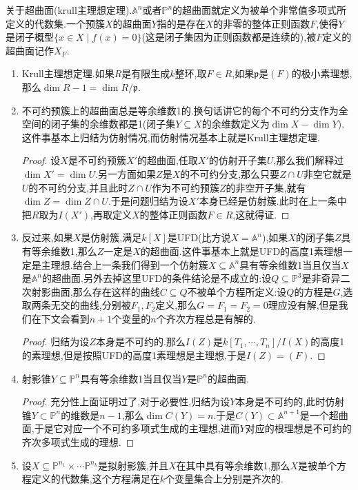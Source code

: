关于超曲面(krull主理想定理).$\mathbb{A}^n$或者$\mathbb{P}^n$的超曲面就定义为被单个非常值多项式所定义的代数集.一个预簇$X$的超曲面$Y$指的是存在$X$的非零的整体正则函数$F$,使得$Y$是闭子概型$\{x\in X\mid f(x)=0\}$(这是闭子集因为正则函数都是连续的),被$F$定义的超曲面记作$X_F$.
\begin{enumerate}
	\item Krull主理想定理.如果$R$是有限生成$k$整环,取$F\in R$,如果$\mathfrak{p}$是$(F)$的极小素理想,那么$\dim R-1=\dim R/\mathfrak{p}$.
	\item 不可约预簇上的超曲面总是等余维数1的.换句话讲它的每个不可约分支作为全空间的闭子集的余维数都是1(闭子集$Y\subseteq X$的余维数定义为$\dim X-\dim Y$).这件事基本上归结为仿射情况,而仿射情况基本上就是Krull主理想定理.
	\begin{proof}
		
		设$X$是不可约预簇$X'$的超曲面,任取$X'$的仿射开子集$U$,那么我们解释过$\dim X'=\dim U$.另一方面如果$Z$是$X$的不可约分支,那么只要$Z\cap U$非空它就是$U$的不可约分支,并且此时$Z\cap U$作为不可约预簇$Z$的非空开子集,就有$\dim Z=\dim Z\cap U$.于是问题归结为设$X'$本身已经是仿射簇.此时在上一条中把$R$取为$I(X')$,再取定义$X$的整体正则函数$F\in R$,这就得证.
	\end{proof}
	\item 反过来,如果$X$是仿射簇,满足$k[X]$是UFD(比方说$X=\mathbb{A}^n$),如果$X$的闭子集$Z$具有等余维数1,那么$Z$一定是$X$的超曲面.这件事基本上就是UFD的高度1素理想一定是主理想.结合上一条我们得到一个仿射簇$X\subseteq\mathbb{A}^n$具有等余维数1当且仅当$X$是$\mathbb{A}^n$的超曲面.另外去掉这里UFD的条件结论是不成立的:设$Q\subseteq\mathbb{P}^3$是非奇异二次射影曲面,那么存在这样的曲线$C\subseteq Q$不被单个方程所定义:设$Q$的方程是$G$,选取两条无交的曲线,分别被$F_1,F_2$定义,那么$G=F_1=F_2=0$理应没有解,但是我们在下文会看到$n+1$个变量的$n$个齐次方程总是有解的.
	\begin{proof}
		
		归结为设$Z$本身是不可约的.那么$I(Z)$是$k[T_1,\cdots,T_n]/I(X)$的高度1的素理想,但是按照UFD的高度1素理想是主理想,于是$I(Z)=(F)$.
	\end{proof}
	\item 射影锥$Y\subseteq\mathbb{P}^n$具有等余维数1当且仅当$Y$是$\mathbb{P}^n$的超曲面.
	\begin{proof}
		
		充分性上面证明过了,对于必要性,归结为设$Y$本身是不可约的,此时仿射锥$Y\subset\mathbb{P}^n$的维数是$n-1$,那么$\dim C(Y)=n$.于是$C(Y)\subset\mathbb{A}^{n+1}$是一个超曲面,于是它对应一个不可约多项式生成的主理想,进而$Y$对应的根理想是不可约的齐次多项式生成的理想.
	\end{proof}
	\item 设$X\subseteq\mathbb{P}^{n_1}\times\cdots\mathbb{P}^{n_k}$是拟射影簇,并且$X$在其中具有等余维数1,那么$X$是被单个方程定义的代数集,这个方程满足在$k$个变量集合上分别是齐次的.
\end{enumerate}

